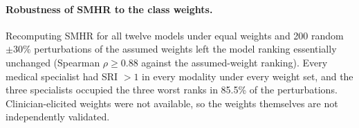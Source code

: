 \paragraph{Robustness of SMHR to the class weights.}
Recomputing SMHR for all twelve models under equal weights and 200 random $\pm30\%$ perturbations of the assumed weights left the model ranking
essentially unchanged (Spearman $\rho \geq 0.88$ against the assumed-weight ranking). Every medical specialist had SRI $>1$ in every modality
under every weight set, and the three specialists occupied the three worst ranks in 85.5\% of the perturbations. Clinician-elicited weights were not available, so
the weights themselves are not independently validated.
